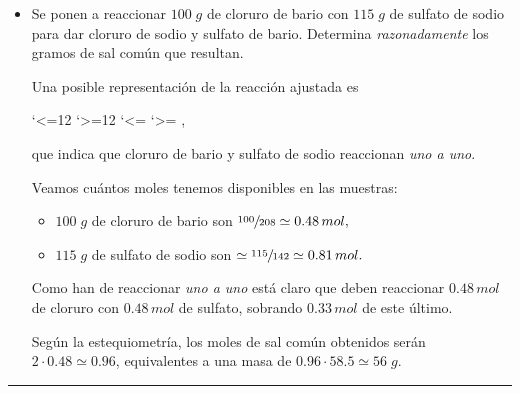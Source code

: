 \documentclass[a4paper,14pt]{extarticle}
\let\chold\ch
\renewcommand\ch[1]{%
    \catcode`<=12
    \catcode`>=12
    \chold{#1}%
    \catcode`<=\active
    \catcode`>=\active
}
\newcommand{\halmos}{
\vspace*{-1ex}

\begin{flushright}
\rule{1mm}{2.5mm} \end{flushright}
\vspace*{-1.5ex}

}
\renewcommand{\qed}{\halmos}
\begin{document}
\begin{enumerate}
\begin{itemize}
\begin{mdframed}[backgroundcolor=brown!10]
    		\end{mdframed}
    		\item[b)] Se ponen a reaccionar $100\;g$ de cloruro de bario con $115\;g$ de sulfato de sodio para dar cloruro de sodio y sulfato de bario. Determina \textit{razonadamente} los gramos de sal común que resultan.
    		\begin{mdframed}[backgroundcolor=brown!10]  
    		Una posible representación de la reacción ajustada es 
    		\begin{center}
    			,
    		\end{center}
    		que indica que cloruro de bario y sulfato de sodio reaccionan \textit{uno a uno}. 
    		\vspace{1ex}
    		
    		Veamos cuántos moles tenemos disponibles en las muestras:
    			\begin{itemize}
    				\item $100\;g$ de cloruro de bario son $\sfrac{100}{208}\simeq 0.48\,mol,$
    				\item $115\;g$ de sulfato de sodio son $	\simeq\sfrac{115}{142}\simeq 0.81\,mol.$
				\end{itemize} 
			Como han de reaccionar \textit{uno a uno} está claro que deben reaccionar $ 0.48\,mol$ de cloruro con $ 0.48\,mol$ de sulfato, sobrando $ 0.33\,mol$ de este último. 
			\vspace{1ex}
			
			Según la estequiometría, los moles de sal común obtenidos serán $2\cdot 0.48\simeq 0.96$, equivalentes a una masa de $ 0.96\cdot 58.5\simeq 56\;g$.

    		\end{mdframed}
    	\end{itemize}
    \qed
    
    \newpage
    

\end{enumerate}
\end{document}
